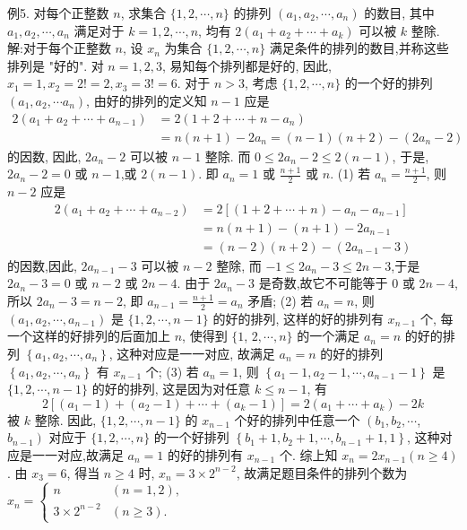例5. 对每个正整数 $n$, 求集合 $\{1,2, \cdots, n\}$ 的排列 $\left(a_1, a_2, \cdots, a_n\right)$ 的数目, 其中 $a_1, a_2, \cdots, a_n$ 满足对于 $k=1,2, \cdots, n$, 均有 $2\left(a_1+a_2+\cdots+a_k\right)$ 可以被 $k$ 整除.
解:对于每个正整数 $n$, 设 $x_n$ 为集合 $\{1,2, \cdots, n\}$ 满足条件的排列的数目,并称这些排列是 "好的". 对 $n=1,2,3$, 易知每个排列都是好的, 因此, $x_1=1, x_2=2 !=2, x_3=3 !=6$.
对于 $n>3$, 考虑 $\{1,2, \cdots, n\}$ 的一个好的排列 $\left(a_1, a_2, \cdots a_n\right)$, 由好的排列的定义知 $n-1$ 应是
$$
\begin{aligned}
2\left(a_1+a_2+\cdots+a_{n-1}\right) & =2\left(1+2+\cdots+n-a_n\right) \\
& =n(n+1)-2 a_n=(n-1)(n+2)-\left(2 a_n-2\right)
\end{aligned}
$$
的因数, 因此, $2 a_n-2$ 可以被 $n-1$ 整除.
而 $0 \leqslant 2 a_n-2 \leqslant 2(n-1)$, 于是, $2 a_n -2=0$ 或 $n-1$,或 $2(n-1)$. 即 $a_n=1$ 或 $\frac{n+1}{2}$ 或 $n$.
(1) 若 $a_n=\frac{n+1}{2}$, 则 $n-2$ 应是
$$
\begin{aligned}
2\left(a_1+a_2+\cdots+a_{n-2}\right) & =2\left[(1+2+\cdots+n)-a_n-a_{n-1}\right] \\
& =n(n+1)-(n+1)-2 a_{n-1} \\
& =(n-2)(n+2)-\left(2 a_{n-1}-3\right)
\end{aligned}
$$
的因数,因此, $2 a_{n-1}-3$ 可以被 $n-2$ 整除, 而 $-1 \leqslant 2 a_n-3 \leqslant 2 n-3$,于是 $2 a_n-3=0$ 或 $n-2$ 或 $2 n-4$. 由于 $2 a_n-3$ 是奇数,故它不可能等于 0 或 $2 n-4$, 所以 $2 a_n-3=n-2$, 即 $a_{n-1}=\frac{n+1}{2}=a_n$ 矛盾;
(2) 若 $a_n=n$, 则 $\left(a_1, a_2, \cdots, a_{n-1}\right)$ 是 $\{1,2, \cdots, n-1\}$ 的好的排列, 这样的好的排列有 $x_{n-1}$ 个, 每一个这样的好排列的后面加上 $n$, 使得到 $\{1$, $2, \cdots, n\}$ 的一个满足 $a_n=n$ 的好的排列 $\left\{a_1, a_2, \cdots, a_n\right\}$, 这种对应是一一对应, 故满足 $a_n=n$ 的好的排列 $\left\{a_1, a_2, \cdots, a_n\right\}$ 有 $x_{n-1}$ 个;
(3) 若 $a_n=1$, 则 $\left\{a_1-1, a_2-1, \cdots, a_{n-1}-1\right\}$ 是 $\{1,2, \cdots, n-1\}$ 的好的排列, 这是因为对任意 $k \leqslant n-1$, 有
$$
2\left[\left(a_1-1\right)+\left(a_2-1\right)+\cdots+\left(a_k-1\right)\right]=2\left(a_1+\cdots+a_k\right)-2 k
$$
被 $k$ 整除.
因此, $\{1,2, \cdots, n-1\}$ 的 $x_{n-1}$ 个好的排列中任意一个 $\left(b_1, b_2, \cdots\right.$, $\left.b_{n-1}\right)$ 对应于 $\{1,2, \cdots, n\}$ 的一个好排列 $\left\{b_1+1, b_2+1, \cdots, b_{n-1}+1,1\right\}$, 这种对应是一一对应,故满足 $a_n=1$ 的好的排列有 $x_{n-1}$ 个.
综上知 $x_n=2 x_{n-1}(n \geqslant 4)$. 由 $x_3=6$, 得当 $n \geqslant 4$ 时, $x_n=3 \times 2^{n-2}$, 故满足题目条件的排列个数为 $x_n= \begin{cases}n & (n=1,2), \\ 3 \times 2^{n-2} & (n \geqslant 3) .\end{cases}$




